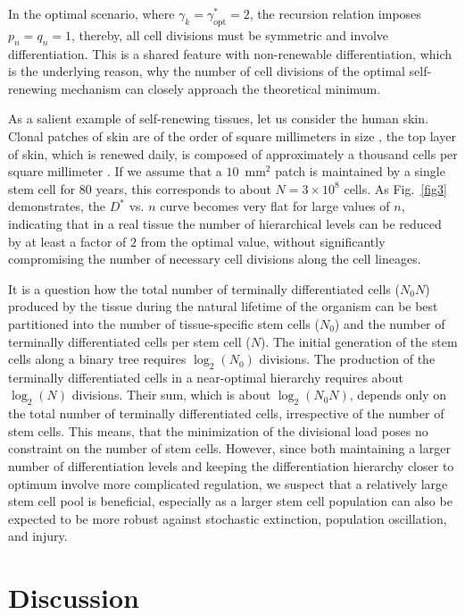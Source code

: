 \documentclass[aps,singlecolumn]{revtex4-1}
\begin{document}
In the optimal scenario, where $\gamma_k = \gamma^*_\textrm{opt} = 2$,
the recursion relation imposes $p_n=q_n=1$, thereby, all cell divisions
must be symmetric and involve differentiation. This is a shared feature
with non-renewable differentiation, which is the underlying reason, why
the number of cell divisions of the optimal self-renewing mechanism can
closely approach the theoretical minimum.

As a salient example of self-renewing tissues,
let us consider the human skin.
Clonal patches of skin are of the
order of square millimeters in size \cite{Martincorena:2015}, the top
layer of skin, which is renewed daily,
is composed of approximately a thousand cells per square millimeter
\cite{Hoath:2003}. If we assume that a $10$~mm$^2$ patch is maintained
by a single stem cell for $80$ years, this
corresponds to about $N =3\times 10^8$ cells.
As Fig.~\ref{fig3}
demonstrates, the $D^*$ vs. $n$ curve becomes very flat for large
values of $n$, indicating that in a real tissue the number of
hierarchical levels can be reduced by at least a factor of $2$ from the
optimal value, without significantly compromising the number of
necessary cell divisions along the cell lineages.

It is a question how the total number of terminally differentiated
cells ($N_0 N$) produced by the tissue during the natural lifetime of
the organism can be best partitioned into the number of tissue-specific
stem cells ($N_0$) and the number of terminally differentiated cells per
stem cell ($N$). The initial generation of the stem cells along a
binary tree requires $\log_2(N_0)$ divisions. The production of the
terminally differentiated cells in a near-optimal hierarchy
requires about $\log_2(N)$ divisions. Their sum, which is about
$\log_2(N_0 N)$, depends only on the total number of terminally
differentiated cells, irrespective of the number of stem cells.
This means, that the minimization of the divisional load poses no constraint
on the number of stem cells. However, since both maintaining a larger
number of differentiation levels and keeping the differentiation
hierarchy closer to optimum involve more complicated regulation,
we suspect that a relatively large stem cell pool is beneficial,
especially as a larger stem cell population can also be expected to
be more robust against stochastic extinction, population oscillation,
and injury.

\section*{Discussion}
\end{document}

